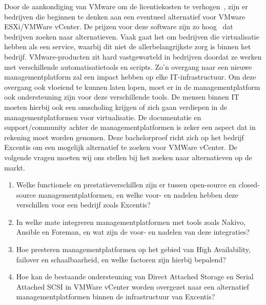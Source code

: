 Door de aankondiging van VMware om de licentiekosten te verhogen~\autocite{device42_2024}, zijn er bedrijven die beginnen te denken aan een eventueel alternatief voor VMware ESXi/VMWare vCenter.
De prijzen voor deze software zijn zo hoog~\autocite{Hale2024} dat bedrijven zoeken naar alternatieven.
Vaak gaat het om bedrijven die virtualisatie hebben als een service, waarbij dit niet de allerbelangrijkste zorg is binnen het bedrijf.
VMware-producten zit hard vastgeworteld in bedrijven doordat ze werken met verschillende automatisatietools en scripts. Zo'n overgang naar een nieuwe managementplatform zal een impact hebben op elke IT-infrastructuur.
Om deze overgang ook vloeiend te kunnen laten lopen, moet er in de managementplatform ook ondersteuning zijn voor deze verschillende tools.
De mensen binnen IT moeten hierbij ook een omscholing krijgen of zich gaan verdiepen in de managementplatformen  voor virtualisatie. De documentatie en support/community achter de managementplatformen is zeker een aspect dat in rekening moet worden genomen.
Deze bachelorproef richt zich op het bedrijf Excentis om een mogelijk alternatief te zoeken voor VMWare vCenter.
De volgende vragen moeten wij ons stellen bij het zoeken naar alternatieven op de markt.
\begin{enumerate}
\item Welke functionele en prestatieverschillen zijn er tussen open-source en closed-source managementplatformen, en welke voor- en nadelen hebben deze verschillen voor een bedrijf zoals Excentis?
\item In welke mate integreren managementplatformen met tools zoals Nakivo, Ansible en Foreman, en wat zijn de voor- en nadelen van deze integraties?
\item Hoe presteren managementplatformen op het gebied van High Availability, failover en schaalbaarheid, en welke factoren zijn hierbij bepalend?
\item Hoe kan de bestaande ondersteuning van Direct Attached Storage en Serial Attached SCSI in VMWare vCenter worden overgezet naar een alternatief managementplatformen binnen de infrastructuur van Excentis?
\end{enumerate}





